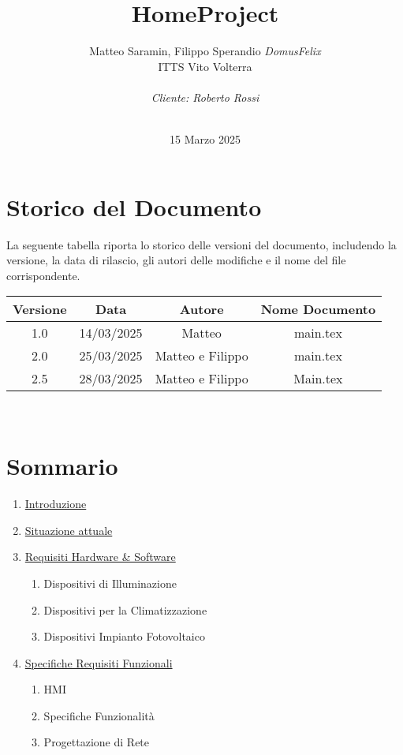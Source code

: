 \documentclass[italian, 12pt, a4paper]{article}
\title{\huge{HomeProject}}
\author{Matteo Saramin, Filippo Sperandio \textit{DomusFelix} \\ {\small ITTS Vito Volterra} \\ \\ \emph{Cliente: Roberto Rossi}}
\date{\version\\ 15 Marzo 2025}
\begin{document}
\maketitle %

\section{Storico del Documento}
La seguente tabella riporta lo storico delle versioni del documento, includendo la versione, la data di rilascio, gli autori delle modifiche e il nome del file corrispondente.

\begin{center}
    \renewcommand{\arraystretch}{1.5} %
    \begin{tabular}{|c|c|c|c|}
        \hline
        \rowcolor{violet!30}
        Versione & Data & Autore & Nome Documento \\
        \hline
        1.0 & 14/03/2025 & Matteo & main.tex \\
        \hline
        2.0&25/03/2025&Matteo e Filippo & main.tex \\
        \hline
        2.5&28/03/2025&Matteo e Filippo&Main.tex\\
        \hline
    \end{tabular}\\[4mm]
\end{center}
\vspace{15mm}
\clearpage
\section{Sommario}
\begin{enumerate}
    \item \hyperref[sec:introduzione]{\Large Introduzione}
    \item \hyperref[sec:situazione]{\Large Situazione attuale}
    \item \hyperref[sec:requisiti]{\Large Requisiti Hardware \& Software}
        \begin{enumerate}
            \item Dispositivi di Illuminazione
            \item Dispositivi per la Climatizzazione
            \item Dispositivi Impianto Fotovoltaico
        \end{enumerate}
    \item \hyperref[sec:requisiti2]{\Large Specifiche Requisiti Funzionali}
        \begin{enumerate}
            \item HMI
            \item Specifiche Funzionalità
            \item Progettazione di Rete
        \end{enumerate}
\end{enumerate}
\clearpage
\end{document}
